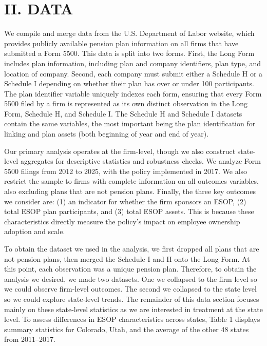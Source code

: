 \documentclass[12pt]{article}
\renewcommand{\normalsize}{\fontsize{12pt}{14pt}\selectfont}
\begin{document}
\section*{\centering \normalsize \textbf{II. DATA}}

We compile and merge data from the U.S. Department of Labor website, which provides publicly available pension plan information on all firms that have submitted a Form 5500. This data is split into two forms. First, the Long Form includes plan information, including plan and company identifiers, plan type, and location of company. Second, each company must submit either a Schedule H or a Schedule I depending on whether their plan has over or under 100 participants. The plan identifier variable uniquely indexes each form, ensuring that every Form 5500 filed by a firm is represented as its own distinct observation in the Long Form, Schedule H, and Schedule I. The Schedule H and Schedule I datasets contain the same variables, the most important being the plan identification for linking and plan assets (both beginning of year and end of year).

Our primary analysis operates at the firm-level, though we also construct state-level aggregates for descriptive statistics and robustness checks. We analyze Form 5500 filings from 2012 to 2025, with the policy implemented in 2017. We also restrict the sample to firms with complete information on all outcomes variables, also excluding plans that are not pension plans. Finally, the three key outcomes we consider are: (1) an indicator for whether the firm sponsors an ESOP, (2) total ESOP plan participants, and (3) total ESOP assets. This is because these characteristics directly measure the policy's impact on employee ownership adoption and scale.

To obtain the dataset we used in the analysis, we first dropped all plans that are not pension plans, then merged the Schedule I and H onto the Long Form. At this point, each observation was a unique pension plan. Therefore, to obtain the analysis we desired, we made two datasets. One we collapsed to the firm level so we could observe firm-level outcomes. The second we collapsed to the state level so we could explore state-level trends. The remainder of this data section focuses mainly on these state-level statistics as we are interested in treatment at the state level. To assess differences in ESOP characteristics across states, Table 1 displays summary statistics for Colorado, Utah, and the average of the other 48 states from 2011--2017.
\end{document}
